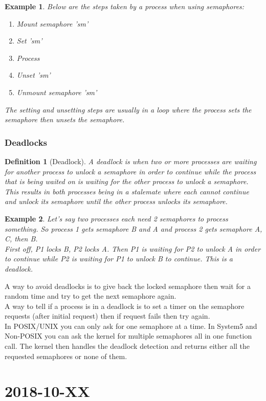 \documentclass{report}
\newtheorem*{ex}{Example}
\newtheorem*{defn}{Definition}
\newcommand{\mychapter}[2]{
	\setcounter{chapter}{#1}
	\setcounter{section}{0}
	\chapter*{#2}
	\addcontentsline{toc}{chapter}{#2}
}
\begin{document}
\begin{ex}
Below are the steps taken by a process when using semaphores:
\begin{enumerate}
\item Mount semaphore 'sm'
\item Set 'sm'
\item Process
\item Unset 'sm'
\item Unmount semaphore 'sm'
\end{enumerate}
The setting and unsetting steps are usually in a loop where the process sets the semaphore then unsets the semaphore.
\end{ex}

\subsection*{Deadlocks}
\begin{defn}[Deadlock]
A deadlock is when two or more processes are waiting for another process to unlock a semaphore in order to continue while the process that is being waited on is waiting for the other process to unlock a semaphore. This results in both processes being in a stalemate where each cannot continue and unlock its semaphore until the other process unlocks its semaphore.
\end{defn}
\begin{ex}
Let's say two processes each need 2 semaphores to process something. So process 1 gets semaphore B and A and process 2 gets semaphore A, C, then B.\\
First off, P1 locks B, P2 locks A. Then P1 is waiting for P2 to unlock A in order to continue while P2 is waiting for P1 to unlock B to continue. This is a deadlock.
\end{ex}

A way to avoid deadlocks is to give back the locked semaphore then wait for a random time and try to get the next semaphore again.\\

A way to tell if a process is in a deadlock is to set a timer on the semaphore requests (after initial request) then if request fails then try again.\\

In POSIX/UNIX you can only ask for one semaphore at a time. In System5 and Non-POSIX you can ask the kernel for multiple semaphores all in one function call. The kernel then handles the deadlock detection and returns either all the requested semaphores or none of them.

\mychapter{5}{2018-10-XX}
\end{document}
